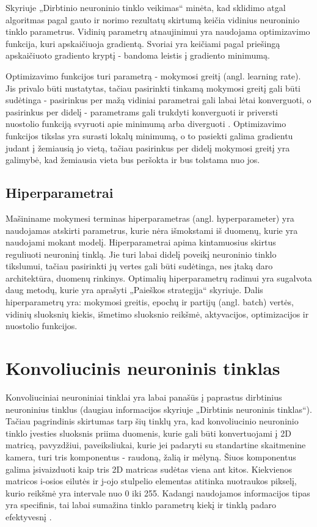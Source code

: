 \documentclass{VUMIFPSbakalaurinis}
\begin{document}
Skyriuje „Dirbtinio neuroninio tinklo veikimas“ minėta, kad sklidimo atgal algoritmas pagal gauto ir norimo 
rezultatų skirtumą keičia vidinius neuroninio tinklo parametrus. Vidinių parametrų atnaujinimui yra naudojama 
optimizavimo funkcija, kuri apskaičiuoja gradientą. Svoriai yra keičiami pagal priešingą apskaičiuoto gradiento 
kryptį - bandoma leistis į gradiento minimumą.

Optimizavimo funkcijos turi parametrą - mokymosi greitį (angl. learning rate). Jis privalo būti nustatytas, tačiau 
pasirinkti tinkamą mokymosi greitį gali būti sudėtinga - pasirinkus per mažą vidiniai parametrai gali labai lėtai 
konverguoti, o pasirinkus per didelį - parametrams gali trukdyti konverguoti ir priversti nuostolio funkciją svyruoti
apie minimumą arba diverguoti \cite{leondes1998image}. Optimizavimo funkcijos tikslas yra surasti lokalų minimumą, 
o to pasiekti galima gradientu judant į žemiausią jo vietą, tačiau pasirinkus per didelį mokymosi greitį yra galimybė, 
kad žemiausia vieta bus peršokta ir bus tolstama nuo jos.

\subsection{Hiperparametrai}

Mašininame mokymesi terminas hiperparametras (angl. hyperparameter) yra naudojamas atskirti parametrus, kurie nėra išmokstami iš duomenų, kurie yra naudojami mokant modelį. Hiperparametrai apima kintamuosius skirtus reguliuoti neuroninį tinklą. Jie turi labai didelį poveikį neuroninio tinklo tikslumui, tačiau pasirinkti jų vertes gali būti sudėtinga, nes įtaką daro architektūra, duomenų rinkinys. Optimalių hiperparametrų radimui yra sugalvota daug metodų, kurie yra aprašyti „Paieškos strategija“ skyriuje. 
Dalis hiperparametrų yra: mokymosi greitis, epochų ir partijų (angl. batch) vertės, vidinių sluoksnių kiekis, išmetimo sluoksnio reikšmė, aktyvacijos, optimizacijos ir nuostolio funkcijos. 

\section{Konvoliucinis neuroninis tinklas}
Konvoliuciniai neuroniniai tinklai yra labai panašūs į paprastus dirbtinius neuroninius tinklus (daugiau informacijos skyriuje „Dirbtinis neuroninis
tinklas“). Tačiau pagrindinis skirtumas tarp šių tinklų yra, kad konvoliucinio neuroninio tinklo įvesties sluoksnis priima duomenis, kurie gali būti konvertuojami į 2D matricą, pavyzdžiui, paveiksliukai, 
kurie jei padaryti su standartine skaitmenine kamera, turi tris komponentus - raudoną, žalią ir mėlyną. Šiuos komponentus galima 
įsivaizduoti kaip tris 2D matricas sudėtas viena ant kitos. Kiekvienos matricos i-osios eilutės ir j-ojo stulpelio elementas 
atitinka nuotraukos pikselį, kurio reikšmė yra intervale nuo 0 iki 255. Kadangi naudojamos informacijos tipas yra specifinis, 
tai labai sumažina tinklo parametrų kiekį ir tinklą padaro efektyvesnį \cite{CnnImages}.
\end{document}
